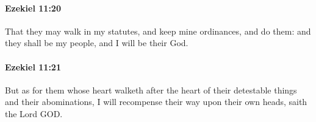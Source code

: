 		\paragraph{Ezekiel 11:20} %
			\label{EZEKIEL-11-20}

			That they may walk in my statutes, and keep mine ordinances, and do them: and they shall be my people, and I will be their God.


		\paragraph{Ezekiel 11:21} %
			\label{EZEKIEL-11-21}

			But as for them whose heart walketh after the heart of their detestable things and their abominations, I will recompense their way upon their own heads, saith the Lord GOD.


